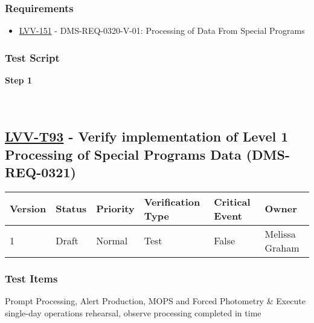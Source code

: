 \hypertarget{requirements-182}{%
\subsubsection{Requirements}\label{requirements-182}}

\begin{itemize}
\tightlist
\item
  \href{https://jira.lsstcorp.org/browse/LVV-151}{LVV-151} -
  DMS-REQ-0320-V-01: Processing of Data From Special Programs
\end{itemize}

\hypertarget{test-script-182}{%
\subsubsection{Test Script}\label{test-script-182}}

\textbf{Step 1}\\
~\\
~\\

\hypertarget{lvv-t93---verify-implementation-of-level-1-processing-of-special-programs-data-dms-req-0321}{%
\subsection{\texorpdfstring{\href{https://jira.lsstcorp.org/secure/Tests.jspa\#/testCase/LVV-T93}{LVV-T93}
- Verify implementation of Level 1 Processing of Special Programs Data
(DMS-REQ-0321)}{LVV-T93 - Verify implementation of Level 1 Processing of Special Programs Data (DMS-REQ-0321)}}\label{lvv-t93---verify-implementation-of-level-1-processing-of-special-programs-data-dms-req-0321}}

\begin{longtable}[]{@{}llllll@{}}
\toprule
Version & Status & Priority & Verification Type & Critical Event &
Owner\tabularnewline
\midrule
\endhead
1 & Draft & Normal & Test & False & Melissa Graham\tabularnewline
\bottomrule
\end{longtable}

\hypertarget{test-items-182}{%
\subsubsection{Test Items}\label{test-items-182}}

Prompt Processing, Alert Production, MOPS and Forced Photometry \&
Execute single-day operations rehearsal, observe processing completed in
time

